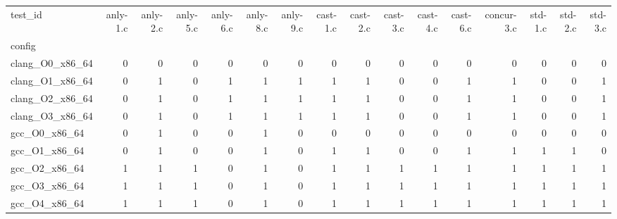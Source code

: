 \begin{tabular}{lrrrrrrrrrrrrrrr}
\toprule
test_id & anly-1.c & anly-2.c & anly-5.c & anly-6.c & anly-8.c & anly-9.c & cast-1.c & cast-2.c & cast-3.c & cast-4.c & cast-6.c & concur-3.c & std-1.c & std-2.c & std-3.c \\
config &  &  &  &  &  &  &  &  &  &  &  &  &  &  &  \\
\midrule
clang_O0_x86_64 & 0 & 0 & 0 & 0 & 0 & 0 & 0 & 0 & 0 & 0 & 0 & 0 & 0 & 0 & 0 \\
clang_O1_x86_64 & 0 & 1 & 0 & 1 & 1 & 1 & 1 & 1 & 0 & 0 & 1 & 1 & 0 & 0 & 1 \\
clang_O2_x86_64 & 0 & 1 & 0 & 1 & 1 & 1 & 1 & 1 & 0 & 0 & 1 & 1 & 0 & 0 & 1 \\
clang_O3_x86_64 & 0 & 1 & 0 & 1 & 1 & 1 & 1 & 1 & 0 & 0 & 1 & 1 & 0 & 0 & 1 \\
gcc_O0_x86_64 & 0 & 1 & 0 & 0 & 1 & 0 & 0 & 0 & 0 & 0 & 0 & 0 & 0 & 0 & 0 \\
gcc_O1_x86_64 & 0 & 1 & 0 & 0 & 1 & 0 & 1 & 1 & 0 & 0 & 1 & 1 & 1 & 1 & 0 \\
gcc_O2_x86_64 & 1 & 1 & 1 & 0 & 1 & 0 & 1 & 1 & 1 & 1 & 1 & 1 & 1 & 1 & 1 \\
gcc_O3_x86_64 & 1 & 1 & 1 & 0 & 1 & 0 & 1 & 1 & 1 & 1 & 1 & 1 & 1 & 1 & 1 \\
gcc_O4_x86_64 & 1 & 1 & 1 & 0 & 1 & 0 & 1 & 1 & 1 & 1 & 1 & 1 & 1 & 1 & 1 \\
\bottomrule
\end{tabular}

